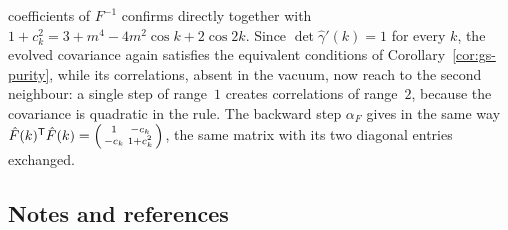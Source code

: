 \begin{example}
{coefficients of $F^{-1}$ confirms directly together with $1+c_k^2=3+m^4-4m^2\cos k+2\cos2k$. Since
$\det\hat\gamma'(k)=1$ for every $k$, the evolved covariance again satisfies the equivalent conditions of
Corollary~\ref{cor:gs-purity}, while its correlations, absent in the vacuum, now reach to the second
neighbour: a single step of range~$1$ creates correlations of range~$2$, because the covariance is
quadratic in the rule. The backward step $\alpha_F$ gives in the same way
$\hat F(k)^{\mathsf T}\hat F(k)=\begin{psmallmatrix}1&-c_k\\-c_k&1+c_k^2\end{psmallmatrix}$, the same
matrix with its two diagonal entries exchanged.}
\end{example}

\subsection{Notes and references}\label{sec:gs-notes}

